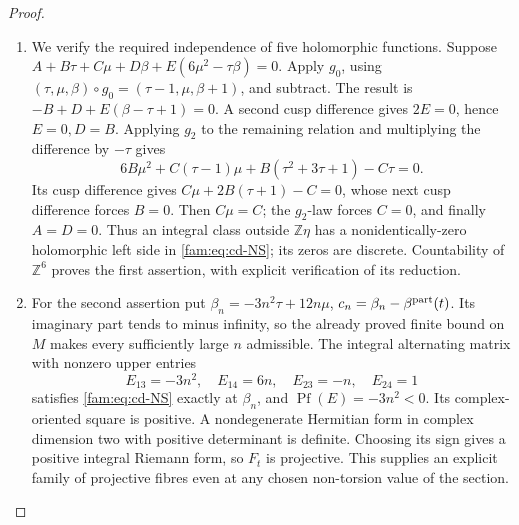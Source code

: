 \begin{proof}
\begin{enumerate}[label=\arabic*.,leftmargin=*]
\item We verify the required independence of five holomorphic functions.
Suppose \(A+B\tau+C\mu+D\beta+E(6\mu^2-\tau\beta)=0\).
Apply \(g_0\), using \((\tau,\mu,\beta)\circ g_0=(\tau-1,\mu,\beta+1)\),
and subtract. The result is \(-B+D+E(\beta-\tau+1)=0\).
A second cusp difference gives \(2E=0\), hence \(E=0,D=B\).
Applying \(g_2\) to the remaining relation and multiplying the difference
by \(-\tau\) gives
\[
 6B\mu^2+C(\tau-1)\mu+B(\tau^2+3\tau+1)-C\tau=0.
\]
Its cusp difference gives \(C\mu+2B(\tau+1)-C=0\), whose next cusp
difference forces \(B=0\). Then \(C\mu=C\); the \(g_2\)-law forces
\(C=0\), and finally \(A=D=0\). Thus an integral class outside
\(\mathbb Z\eta\) has a nonidentically-zero holomorphic left side in
\eqref{fam:eq:cd-NS}; its zeros are discrete. Countability of \(\mathbb Z^6\)
proves the first assertion, with explicit verification of its reduction.

\item For the second assertion put
\(\beta_n=-3n^2\tau+12n\mu\),
\(c_n=\beta_n-\beta^{\rm part}(t)\). Its imaginary part tends to
minus infinity, so the already proved finite bound on \(M\) makes every
sufficiently large \(n\) admissible. The integral alternating matrix
with nonzero upper entries
\[
 E_{13}=-3n^2,\quad E_{14}=6n,\quad E_{23}=-n,\quad E_{24}=1
\]
satisfies \eqref{fam:eq:cd-NS} exactly at \(\beta_n\), and
\(\operatorname{Pf}(E)=-3n^2<0\). Its complex-oriented square is positive.
A nondegenerate Hermitian form in complex dimension two with positive
determinant is definite. Choosing its sign gives a positive integral
Riemann form, so \(F_t\) is projective. This supplies an explicit family
of projective fibres even at any chosen non-torsion value of the section.
\end{enumerate}
\end{proof}

